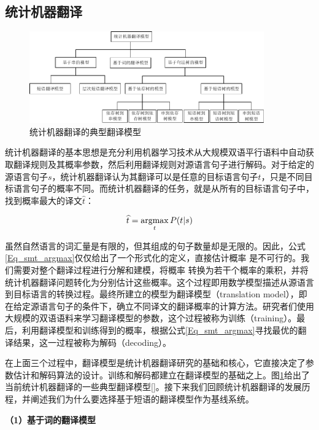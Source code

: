 \subsection{统计机器翻译}

\begin{figure}[!htbp]
	\centering
	\includegraphics[width=0.9\textwidth]{Figure/Figure_2_2.pdf}
	\caption{统计机器翻译的典型翻译模型}
	\label{Fig_smt_model}
\end{figure}

统计机器翻译的基本思想是充分利用机器学习技术从大规模双语平行语料中自动获取翻译规则及其概率参数，然后利用翻译规则对源语言句子进行解码。对于给定的源语言句子$s$，统计机器翻译认为其翻译可以是任意的目标语言句子$t$，只是不同目标语言句子的概率不同。而统计机器翻译的任务，就是从所有的目标语言句子中，找到概率最大的译文$\widehat{t}$：

\begin{equation}
\label{Eq_smt_argmax}
\widehat{t} = \mathop{\argmax}_{t}{P(t|s)}
\end{equation}

虽然自然语言的词汇量是有限的，但其组成的句子数量却是无限的。因此，公式\ref{Eq_smt_argmax}仅仅给出了一个形式化的定义，直接估计概率 是不可行的。我们需要对整个翻译过程进行分解和建模，将概率 转换为若干个概率的乘积，并将统计机器翻译问题转化为分别估计这些概率。这个过程即用数学模型描述从源语言到目标语言的转换过程。最终所建立的模型为翻译模型（translation model），即在给定源语言句子的条件下，确立不同译文的翻译概率的计算方法。研究者们使用大规模的双语语料来学习翻译模型的参数，这个过程被称为训练（training）。最后，利用翻译模型和训练得到的概率，根据公式\ref{Eq_smt_argmax}寻找最优的翻译结果，这一过程被称为解码（decoding）。

在上面三个过程中，翻译模型是统计机器翻译研究的基础和核心，它直接决定了参数估计和解码算法的设计。训练和解码都建立在翻译模型的基础之上。图\ref{Fig_smt_model}给出了当前统计机器翻译的一些典型翻译模型[\cite{zhangzong:2013}]。接下来我们回顾统计机器翻译的发展历程，并阐述我们为什么要选择基于短语的翻译模型作为基线系统。

\textbf{（1）基于词的翻译模型}

